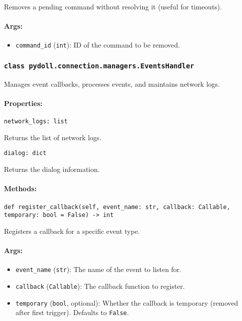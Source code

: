 \documentclass{article}
\begin{document}
\noindent Removes a pending command without resolving it (useful for timeouts).

\paragraph{Args:}
\begin{itemize}
    \item \texttt{command\_id} (\texttt{int}): ID of the command to be removed.
\end{itemize}

\subsubsection*{\texttt{class pydoll.connection.managers.EventsHandler}}
\noindent Manages event callbacks, processes events, and maintains network logs.

\paragraph{Properties:}
\noindent\texttt{network\_logs: list}

\noindent Returns the list of network logs.

\noindent\texttt{dialog: dict}

\noindent Returns the dialog information.

\paragraph{Methods:}
\noindent\texttt{def register\_callback(self, event\_name: str, callback: Callable, temporary: bool = False) -> int}

\noindent Registers a callback for a specific event type.

\paragraph{Args:}
\begin{itemize}
    \item \texttt{event\_name} (\texttt{str}): The name of the event to listen for.
    \item \texttt{callback} (\texttt{Callable}): The callback function to register.
    \item \texttt{temporary} (\texttt{bool}, optional): Whether the callback is temporary (removed after first trigger). Defaults to \texttt{False}.
\end{itemize}
\end{document}

